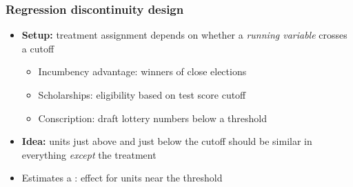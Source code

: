 \begin{frame}
\frametitle{Regression discontinuity design}
\centering

\begin{itemize}[<+->]
\item \textbf{Setup:} treatment assignment depends on whether a \textit{running variable} crosses a cutoff
  \begin{itemize}
  \item Incumbency advantage: winners of close elections
  \item Scholarships: eligibility based on test score cutoff
  \item Conscription: draft lottery numbers below a threshold
  \end{itemize}
\vspace{6pt}
\item \textbf{Idea:} units just above and just below the cutoff should be similar in everything \textit{except} the treatment
\vspace{6pt}
\item Estimates a : effect for units near the threshold
\end{itemize}

\end{frame}

